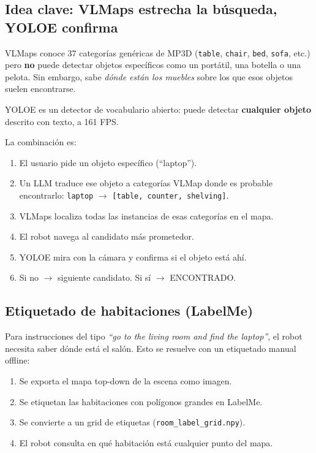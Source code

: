 \documentclass[11pt,a4paper]{article}
\begin{document}
\subsection{Idea clave: VLMaps estrecha la búsqueda, YOLOE confirma}

VLMaps conoce 37 categorías genéricas de MP3D (\texttt{table}, \texttt{chair}, \texttt{bed}, \texttt{sofa}, etc.) pero \textbf{no} puede detectar objetos específicos como un portátil, una botella o una pelota. Sin embargo, sabe \textit{dónde están los muebles} sobre los que esos objetos suelen encontrarse.

YOLOE es un detector de vocabulario abierto: puede detectar \textbf{cualquier objeto} descrito con texto, a 161 FPS.

La combinación es:
\begin{enumerate}
    \item El usuario pide un objeto específico (``laptop'').
    \item Un LLM traduce ese objeto a categorías VLMap donde es probable encontrarlo: \texttt{laptop} $\rightarrow$ \texttt{[table, counter, shelving]}.
    \item VLMaps localiza todas las instancias de esas categorías en el mapa.
    \item El robot navega al candidato más prometedor.
    \item YOLOE mira con la cámara y confirma si el objeto está ahí.
    \item Si no $\rightarrow$ siguiente candidato. Si sí $\rightarrow$ ENCONTRADO.
\end{enumerate}

\subsection{Etiquetado de habitaciones (LabelMe)}

Para instrucciones del tipo \textit{``go to the living room and find the laptop''}, el robot necesita saber dónde está el salón. Esto se resuelve con un etiquetado manual offline:
\begin{enumerate}
    \item Se exporta el mapa top-down de la escena como imagen.
    \item Se etiquetan las habitaciones con polígonos grandes en LabelMe.
    \item Se convierte a un grid de etiquetas (\texttt{room\_label\_grid.npy}).
    \item El robot consulta en qué habitación está cualquier punto del mapa.
\end{enumerate}
\end{document}

